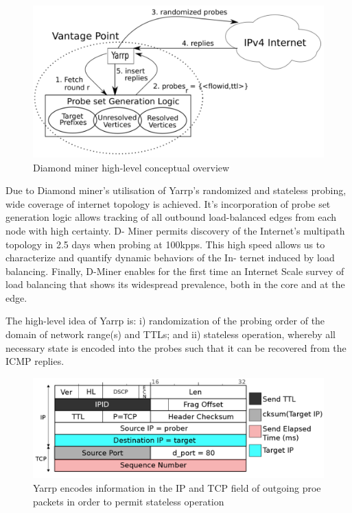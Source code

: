 \begin{figure}[!ht]
  \begin{center}
    \includegraphics[scale=0.3]{images/diamond.png}
    \caption{Diamond miner high-level conceptual overview \cite{diamond-miner}}
    \label{figure:dminer_overview_fig}
  \end{center}
\end{figure}

Due to Diamond miner's utilisation of Yarrp's randomized and stateless probing, wide coverage of internet topology is achieved. It's incorporation of probe set generation logic allows tracking of  all outbound load-balanced edges from each node with high certainty. D-
Miner permits discovery of the Internet’s multipath topology
in 2.5 days when probing at 100kpps. This high speed allows
us to characterize and quantify dynamic behaviors of the In-
ternet induced by load balancing. Finally, D-Miner enables
for the first time an Internet Scale survey of load balancing
that shows its widespread prevalence, both in the core and at
the edge. \cite{diamond-miner}

The high-level idea of Yarrp is: i) randomization of the probing order of the domain of network range(s) and TTLs; and ii) stateless operation, whereby all necessary state is encoded into the probes such that it can be recovered from the ICMP replies.\cite{yarrp}

\begin{figure}[!ht]
  \begin{center}
    \includegraphics[scale=0.3]{images/yarrp.png}
    \caption{Yarrp encodes information in the IP and TCP field of outgoing proe packets in order to permit stateless operation \cite{yarrp}}
    \label{figure:yarrp_fig}
  \end{center}
\end{figure}

